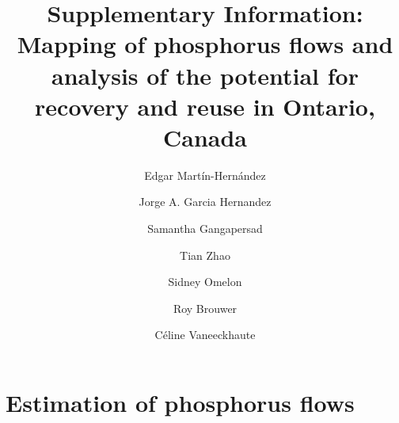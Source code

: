 \documentclass[authoryear]{elsarticle}
\begin{document}
	\begin{frontmatter}
		\title{
			Supplementary Information: \\ Mapping of phosphorus flows and analysis of the potential for recovery and reuse in Ontario, Canada
		}
		
		\author[ULaval]{Edgar Martín-Hernández}
		\author[Waterloo]{Jorge A. Garcia Hernandez}
		\author[McGill]{Samantha Gangapersad}
		\author[McGill]{Tian Zhao}
		\author[McGill]{Sidney Omelon}
		\author[Waterloo,TheWaterInstitute]{Roy Brouwer}
		\author[ULaval,CentrEau]{Céline Vaneeckhaute}
		
		\address[ULaval]{BioEngine - Research Team on Green Process Engineering and Biorefineries, Chemical Engineering Department, Université Laval, 1065 Ave. de la Médecine, Québec, QC, G1V 0A6, Canada}
		\address[CentrEau]{CentrEau, Centre de recherche sur l'eau, Université Laval, 1065 Avenue de la Médecine, Québec, QC, G1V 0A6, Canada}
		\address[McGill]{Department of Mining and Materials	Engineering, McGill University, Montréal, Canada}
		\address[Waterloo]{Department of Economics, University of Waterloo, 200 University Avenue West, Waterloo, ON, N2L 3G1, Canada}
		\address[TheWaterInstitute]{The Water Institute, University of Waterloo, 200 University Avenue West, Waterloo, ON, N2L 3G1, Canada}
		
%			
	\end{frontmatter}
	
	\tableofcontents
	
\newpage
	
\section{Estimation of phosphorus flows}
\end{document}
